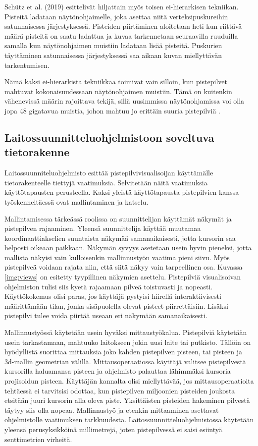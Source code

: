 Schütz et al. (2019) esittelivät hiljattain myös toisen ei-hierarkisen tekniikan. Pisteitä ladataan näytönohjaimelle, joka asettaa niitä verteksipuskureihin satunnaisessa järjestyksessä. Pisteiden piirtäminen aloitetaan heti kun riittävä määrä pisteitä on saatu ladattua ja kuvaa tarkennetaan seuraavilla ruuduilla samalla kun näytönohjaimen muistiin ladataan lisää pisteitä. Puskurien täyttäminen satunnaisessa järjestyksessä saa aikaan kuvan miellyttävän tarkentumisen. \cite{progressive}

Nämä kaksi ei-hierarkista tekniikkaa toimivat vain silloin, kun pistepilvet mahtuvat kokonaisuudessaan näytönohjaimen muistiin. Tämä on kuitenkin vähenevissä määrin rajoittava tekijä, sillä uusimmissa näytönohjamissa voi olla jopa 48 gigatavua muistia, johon mahtuu jo erittäin suuria pistepilviä \cite{rtx}.

\subsection{Laitossuunnitteluohjelmistoon soveltuva tietorakenne}\label{usecase}

Laitossuunniteluohjelmisto esittää pistepilvivisualisoijan käyttämälle tietorakenteelle tiettyjä vaatimuksia. Selvitetään näitä vaatimuksia käyttötapausten perusteella. Kaksi yleistä käyttötapausta pistepilvien kanssa työskenneltäessä ovat mallintaminen ja katselu. 

Mallintamisessa tärkeässä roolissa on suunnittelijan käyttämät näkymät ja pistepilven rajaaminen. Yleensä suunnittelija käyttää muutamaa koordinaattiakselien suuntaista näkymää samanaikaisesti, jotta kursorin saa helposti oikeaan paikkaan. Näkymän syvyys asetetaan usein hyvin pieneksi, jotta mallista näkyisi vain kulloisenkin mallinnustyön vaatima pieni siivu. Myös pistepilveä voidaan rajata niin, että siitä näkyy vain tarpeellinen osa. Kuvassa \ref{img:views} on esitetty tyypillinen näkymien asettelu. Pistepilviä visualisoivan ohjelmiston tulisi siis kyetä rajaamaan pilveä toistuvasti ja nopeasti. Käyttökokemus olisi paras, jos käyttäjä pystyisi hiirellä interaktiivisesti määrittämään tilan, jonka sisäpuolella olevat pisteet piirrettäisiin. Lisäksi pistepilvi tulee voida piirtää useaan eri näkymään samanaikaisesti.

Mallinnustyössä käytetään usein hyväksi mittaustyökalua. Pistepilviä käytetään usein tarkastamaan, mahtuuko laitokseen jokin uusi laite tai putkisto. Tällöin on hyödyllistä suorittaa mittauksia joko kahden pistepilven pisteen, tai pisteen ja 3d-mallin geometrian välillä. Mittausoperaatiossa käyttäjä valitsee pistepilvestä kursorilla haluamansa pisteen ja ohjelmisto palauttaa lähimmäksi kursoria projisoidun pisteen. Käyttäjän kannalta olisi miellyttävää, jos mittausoperaatioita tehtäessä ei tarvitsisi odottaa, kun pistepilven miljoonien pisteiden joukosta etsitään juuri kursorin alla oleva piste. Yksittäisten pisteiden hakeminen pilvestä täytyy siis olla nopeaa. Mallinnustyö ja etenkin mittaaminen asettavat ohjelmistolle vaatimuksen tarkkuudesta. Laitossuunnitteluohjelmistossa käytetään yleensä perusyksikköinä millimetrejä, joten pistepilvessä ei saisi esiintyä senttimetrien virheitä.

